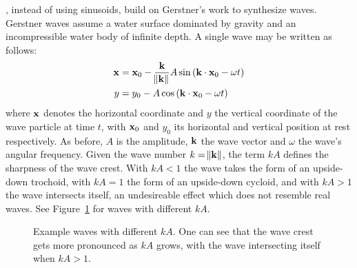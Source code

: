 \cite{Fournier:1986}, instead of using sinusoids, build on Gerstner's work
\citep{Gerstner:1809, Rankine:1863} to synthesize waves. Gerstner waves assume
a water surface dominated by gravity and an incompressible water body of
infinite depth. A single wave may be written as follows:
\begin{align}
\mathbf{x} &= \mathbf{x}_0 - \frac{\mathbf{k}}{\norm{\mathbf{k}}} A \sin\left(\mathbf{k}\cdot\mathbf{x}_0-\omega t\right)\\
y &= y_0 - A \cos\left(\mathbf{k}\cdot\mathbf{x}_0-\omega t\right)
\end{align}
where $\mathbf{x}$ denotes the horizontal coordinate and $y$ the vertical coordinate
of the wave particle at time $t$, with $\mathbf{x}_0$ and $y_0$ its horizontal
and vertical position at rest respectively. As before, $A$ is the amplitude,
$\mathbf{k}$ the wave vector and $\omega$ the wave's angular frequency. Given the
wave number $k=\norm{\mathbf{k}}$, the term $kA$ defines the sharpness of the wave
crest. With $kA<1$ the wave takes the form of an upside-down trochoid, with
$kA=1$ the form of an upside-down cycloid, and with $kA>1$ the wave intersects
itself, an undesireable effect which does not resemble real waves.
See Figure~\ref{fig:trochoid:crests} for waves with different $kA$.
%
\begin{figure}
\caption{Example waves with different $kA$. One can see that the wave crest gets more pronounced as $kA$ grows,
with the wave intersecting itself when $kA > 1$.}
\label{fig:trochoid:crests}
\end{figure}
